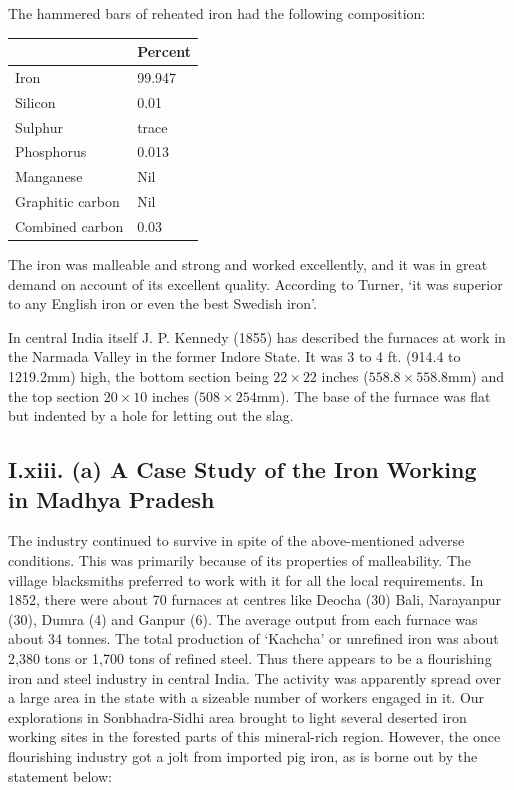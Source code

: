 The hammered bars of reheated iron had the following composition:

{\fontsize{8}{10}\selectfont\begin{center}
\begin{tabular}{|l|l|}
\hline
 & Percent\\
\hline
Iron & 99.947\\
\hline
Silicon & 0.01\\
\hline
Sulphur & trace\\
\hline
Phosphorus & 0.013\\
\hline
Manganese & Nil\\
\hline
Graphitic carbon & Nil\\
\hline
Combined carbon & 0.03\\
\hline
\end{tabular}
\end{center}}

The iron was malleable and strong and worked excellently, and it was in great demand on account of its excellent quality. According to Turner, `it was superior to any English iron or even the best Swedish iron'. 

In central India itself J. P. Kennedy (1855) has described the furnaces at work in the Narmada Valley in the former Indore State. It was 3 to 4 ft. (914.4 to 1219.2mm) high, the bottom section being $22 \times 22$ inches ($558.8 \times 558.8$mm) and the top section $20 \times 10$ inches ($508 \times 254$mm). The base of the furnace was flat but indented by a hole for letting out the slag.

\vspace{-.3cm}

\subsection*{I.xiii. (a) A Case Study of the Iron Working\\ in Madhya Pradesh}\label{subsection-13}

\vspace{-.2cm}

The industry continued to survive in spite of the above-mentioned adverse conditions.  This was primarily because of its properties of malleability. The village blacksmiths preferred to work with it for all the local requirements. In 1852, there were about 70 furnaces at centres like Deocha (30) Bali, Narayanpur (30), Dumra (4) and Ganpur (6).  The average output from each furnace was about 34 tonnes.  The total production of `Kachcha' or unrefined iron was about 2,380 tons or 1,700 tons of refined steel. Thus there appears to be a flourishing iron and steel industry in central India. The activity was apparently spread over a large area in the state with a sizeable number of workers engaged in it. Our explorations in Sonbhadra-Sidhi area brought to light several deserted iron working sites in the forested parts of this mineral-rich region. However, the once flourishing industry got a jolt from imported pig iron, as is borne out by the statement below:  

